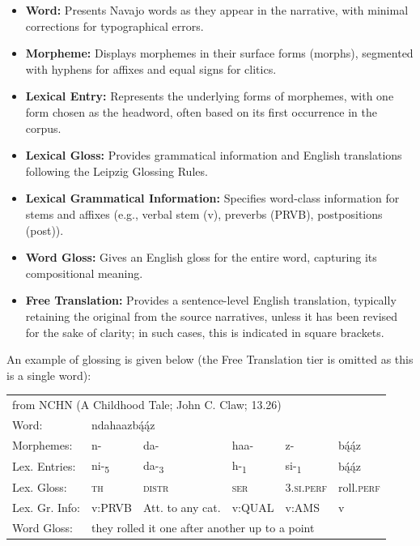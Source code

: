 \begin{itemize}
    \item \textbf{Word:} Presents Navajo words as they appear in the narrative, with minimal corrections for typographical errors.
    \item \textbf{Morpheme:} Displays morphemes in their surface forms (morphs), segmented with hyphens for affixes and equal signs for clitics.
    \item \textbf{Lexical Entry:} Represents the underlying forms of morphemes, with one form chosen as the headword, often based on its first occurrence in the corpus.
    \item \textbf{Lexical Gloss:} Provides grammatical information and English translations following the Leipzig Glossing Rules.
    \item \textbf{Lexical Grammatical Information:} Specifies word-class information for stems and affixes (e.g., verbal stem (v), preverbs (PRVB), postpositions (post)).
    \item \textbf{Word Gloss:} Gives an English gloss for the entire word, capturing its compositional meaning.
    \item \textbf{Free Translation:} Provides a sentence-level English translation, typically retaining the original from the source narratives, unless it has been revised for the sake of clarity; in such cases, this is indicated in square brackets.
\end{itemize}

An example of glossing is given below (the Free Translation tier is omitted as this is a single word):

\begin{table}
    \begin{tabular}{llllll}
        \multicolumn{6}{l}{from NCHN (A Childhood Tale; John C. Claw; 13.26)}\\
        Word: & \multicolumn{5}{l}{ndahaazbą́ą́z}\\
        Morphemes: & n- & da- & haa- & z- & bą́ą́z\\
        Lex. Entries: & ni-\textsubscript{5} & da-\textsubscript{3} & h-\textsubscript{1} & si-\textsubscript{1} & bą́ą́z\\  
        Lex. Gloss: & \textsc{th} & \textsc{distr} & \textsc{ser} & 3.\textsc{si}.\textsc{perf} & roll.\textsc{perf}\\
        Lex. Gr. Info: & v:PRVB & Att. to any cat. & v:QUAL & v:AMS & v\\
        Word Gloss: & \multicolumn{5}{l}{they rolled it one after another up to a point}\\
    \end{tabular}   
\end{table}

